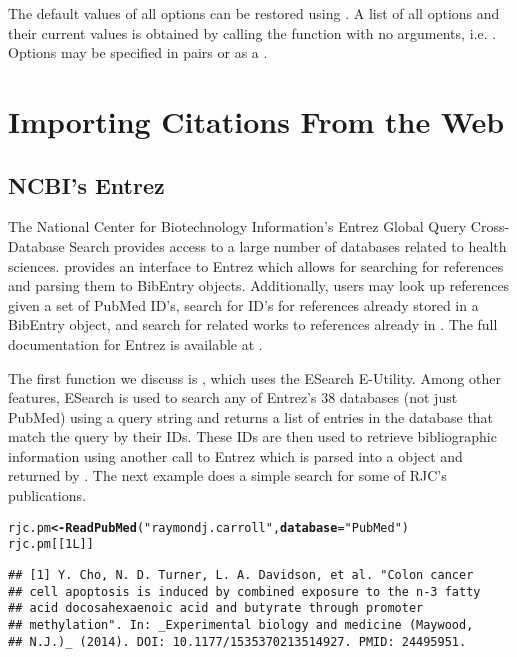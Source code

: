 \documentclass[article]{jss}\usepackage[]{graphicx}\usepackage[]{color}
\makeatletter
\newcommand{\hlnum}[1]{\textcolor[rgb]{0.125,0.125,1}{#1}}%
\newcommand{\hlstr}[1]{\textcolor[rgb]{0.125,0.125,1}{#1}}%
\newcommand{\hlstd}[1]{\textcolor[rgb]{0.251,0.251,0.282}{#1}}%
\newcommand{\hlkwb}[1]{\textcolor[rgb]{0.439,0.251,1}{\textbf{#1}}}%
\newcommand{\hlkwc}[1]{\textcolor[rgb]{0.529,0,0.184}{\textbf{#1}}}%
\newcommand{\hlkwd}[1]{\textcolor[rgb]{0.251,0.251,0.282}{\textbf{#1}}}%
\newenvironment{kframe}{%
 \def\at@end@of@kframe{}%
 \ifinner\ifhmode%
  \def\at@end@of@kframe{\end{minipage}}%
  \begin{minipage}{\columnwidth}%
 \fi\fi%
 \def\FrameCommand##1{\hskip\@totalleftmargin \hskip-\fboxsep
 \colorbox{shadecolor}{##1}\hskip-\fboxsep
     \hskip-\linewidth \hskip-\@totalleftmargin \hskip\columnwidth}%
 \MakeFramed {\advance\hsize-\width
   \@totalleftmargin\z@ \linewidth\hsize
   \@setminipage}}%
 {\par\unskip\endMakeFramed%
 \at@end@of@kframe}
\newenvironment{knitrout}{}{} %
\newcommand{\ourpkg}{\pkg{RefManageR}}
\makeatother
\begin{document}
The default values of all options can be restored using .  A list of all options and their current values is obtained by calling the function with no arguments, i.e. .  Options may be specified in  pairs or as a .
\section{Importing Citations From the Web}\label{sec_import}
\subsection{NCBI's Entrez}
The National Center for Biotechnology Information's Entrez Global Query Cross-Database Search provides access to a large number of databases related to health sciences. \ourpkg{} provides an interface to Entrez which allows for searching for references and parsing them to BibEntry objects.  Additionally, users may look up references given a set of PubMed ID's, search for ID's for references already stored in a BibEntry object, and search for related works to references already in \R{}.  The full documentation for Entrez is available at \citet{entrez}.

The first \ourpkg{} function we discuss is , which uses the ESearch E-Utility.  Among other features, ESearch is used to search any of Entrez's 38 databases (not just PubMed) using a query string and returns a list of entries in the database that match the query by their IDs. These IDs are then used to retrieve bibliographic information using another call to Entrez which is parsed into a  object and returned by .  The next example does a simple search for some of RJC's publications.
\begin{knitrout}
\color{fgcolor}\begin{kframe}
\begin{alltt}
\hlstd{rjc.pm} \hlkwb{<-} \hlkwd{ReadPubMed}\hlstd{(}\hlstr{"raymond j. carroll"}\hlstd{,} \hlkwc{database} \hlstd{=} \hlstr{"PubMed"}\hlstd{)}
\hlstd{rjc.pm[[}\hlnum{1L}\hlstd{]]}
\end{alltt}
\begin{verbatim}
## [1] Y. Cho, N. D. Turner, L. A. Davidson, et al. "Colon cancer
## cell apoptosis is induced by combined exposure to the n-3 fatty
## acid docosahexaenoic acid and butyrate through promoter
## methylation". In: _Experimental biology and medicine (Maywood,
## N.J.)_ (2014). DOI: 10.1177/1535370213514927. PMID: 24495951.
\end{verbatim}
\end{kframe}
\end{knitrout}
\end{document}
